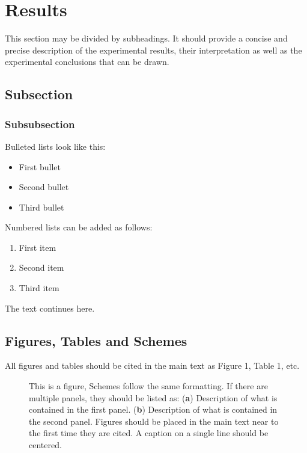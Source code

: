 
\section{Results}

 This section may be divided by subheadings. It should provide a
concise and precise description of the experimental results, their
interpretation as well as the experimental conclusions that can be
drawn.

\subsection{Subsection}
\subsubsection{Subsubsection}

Bulleted lists look like this:
\begin{itemize}[leftmargin=*,labelsep=4mm]
\item First bullet
\item Second bullet
\item Third bullet
\end{itemize}

Numbered lists can be added as follows:
\begin{enumerate}[leftmargin=*,labelsep=3mm]
\item First item
\item Second item
\item Third item
\end{enumerate}

The text continues here.

\subsection{Figures, Tables and Schemes}

All figures and tables should be cited in the main text as Figure 1,
Table 1, etc.

\begin{figure}[H]
  \centering %
  \caption{This is a figure, Schemes follow the same formatting. If
    there are multiple panels, they should be listed as: (\textbf{a})
    Description of what is contained in the first panel. (\textbf{b})
    Description of what is contained in the second panel. Figures
    should be placed in the main text near to the first time they are
    cited. A caption on a single line should be centered.}
\end{figure}   

